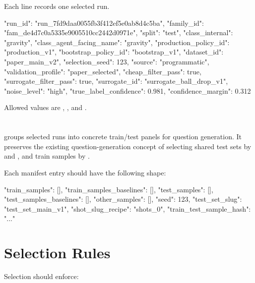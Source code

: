 \documentclass[11pt]{article}
\begin{document}
Each line records one selected run.

\begin{DocCode}
{
  "run_id": "run_7fd9daa0055fb3f412ef5e0ab8d4c5ba",
  "family_id": "fam_de4d7c0a5335e9005510cc2442d0971e",
  "split": "test",
  "class_internal": "gravity",
  "class_agent_facing_name": "gravity",
  "production_policy_id": "production_v1",
  "bootstrap_policy_id": "bootstrap_v1",
  "dataset_id": "paper_main_v2",
  "selection_seed": 123,
  "source": "programmatic",
  "validation_profile": "paper_selected",
  "cheap_filter_pass": true,
  "surrogate_filter_pass": true,
  "surrogate_id": "surrogate_ball_drop_v1",
  "noise_level": "high",
  "true_label_confidence": 0.981,
  "confidence_margin": 0.312
}
\end{DocCode}

Allowed  values are , , and .

\section*{\texorpdfstring{}{sample\_manifest.json}}

 groups selected runs into concrete train/test panels for question generation.
It preserves the existing question-generation concept of selecting shared test sets by  and , and train samples by .

Each manifest entry should have the following shape:

\begin{DocCode}
{
  "train_samples": [],
  "train_samples_baselines": [],
  "test_samples": [],
  "test_samples_baselines": [],
  "other_samples": [],
  "seed": 123,
  "test_set_slug": "test_set_main_v1",
  "shot_slug_recipe": "shots_0",
  "train_test_sample_hash": "..."
}
\end{DocCode}

\section*{Selection Rules}

Selection should enforce:
\end{document}
